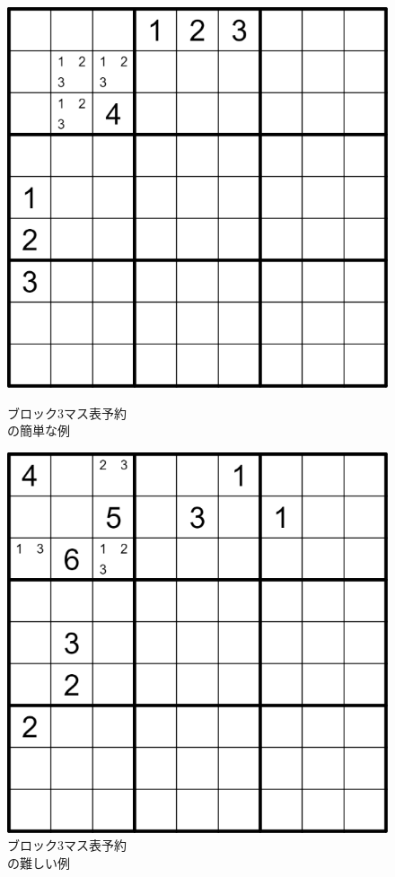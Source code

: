 \documentclass[submit,techrep,noauthor]{ipsj}
\begin{document}
	\begin{figure}[tb]
	\begin{minipage}[t]{0.5\columnwidth}
 	\includegraphics[keepaspectratio, scale=0.2]
      		{sample_yoyaku_block3_easy.png}
 	\caption{ブロック3マス表予約\\の簡単な例}
 	\label{sample_yoyaku_block3_easy}
	\end{minipage}%
	\begin{minipage}[t]{0.5\columnwidth}
 	\includegraphics[keepaspectratio, scale=0.2]
      		{sample_yoyaku_block3_difficult.png}
 	\caption{ブロック3マス表予約\\の難しい例}
 	\label{sample_yoyaku_block3_difficult}
	\end{minipage}
	\end{figure}
\end{document}
